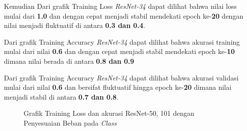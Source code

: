 Kemudian Dari grafik Training Loss \emph{ResNet-34} dapat dilihat bahwa nilai loss mulai dari \textbf{1.0} dan dengan cepat menjadi stabil mendekati epoch ke-\textbf{20} dengan nilai menjadi fluktuatif di antara \textbf{0.3 dan 0.4}.

Dari grafik Training Accuracy \emph{ResNet-34} dapat dilihat bahwa akurasi training mulai dari nilai \textbf{0.6} dan dengan cepat menjadi stabil mendekati epoch ke-\textbf{10} dimana nilai berada di antara \textbf{0.8 dan 0.9} 

Dari grafik Training Accuracy \emph{ResNet-34} dapat dilihat bahwa akurasi validasi mulai dari nilai \textbf{0.6} dan bersifat fluktuatif hingga epoch ke-\textbf{20} dimana nilai menjadi stabil di antara \textbf{0.7 dan 0.8}.

\begin{figure}
	\centering
	\qquad
	\caption{Grafik Training Loss dan akurasi ResNet-50, 101 dengan Penyesuaian Beban pada \emph{Class}}
	\label{fig:graphTrainingWeightedPt2}
\end{figure}


